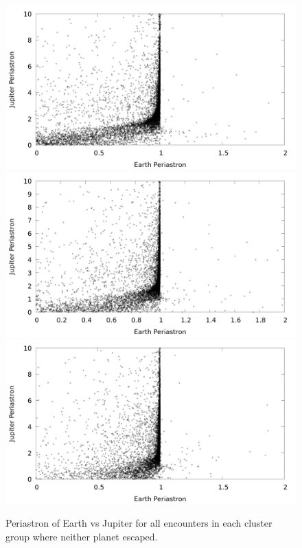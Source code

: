 \documentclass[12pt]{article}
\begin{document}
    \begin{figure}[H]
        \caption{Periastron of Earth vs Jupiter for all encounters
            in each cluster group where neither planet escaped.
        }
        \centering
        \includegraphics[width=5in]{evj_peri_earth_jupiter_1000} 
        \includegraphics[width=5in]{evj_peri_earth_jupiter_2000} 
        \includegraphics[width=5in]{evj_peri_earth_jupiter_4000} 
    \end{figure}
\end{document}
